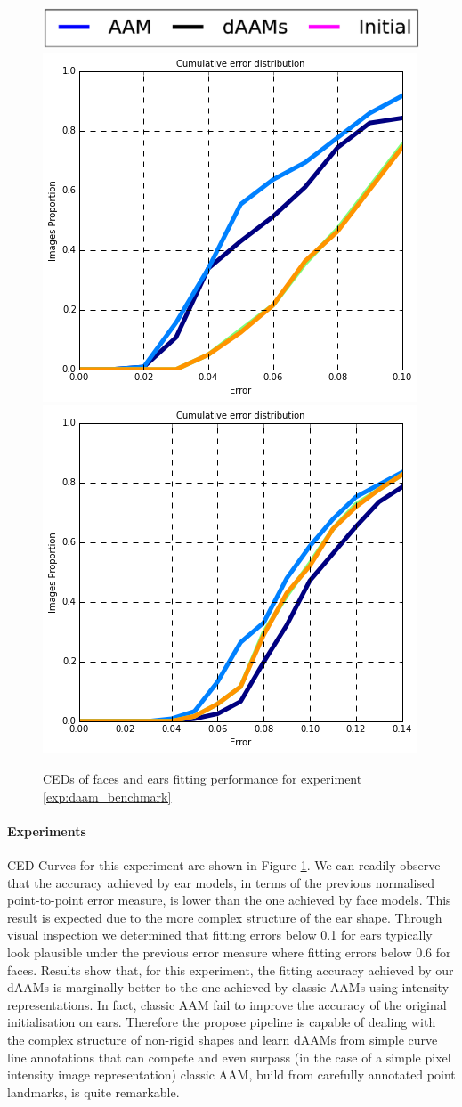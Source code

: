 \begin{figure}[b!]
    \centering
    \includegraphics[width=0.6\columnwidth]{resources/DAAMBenchmark/legend}
    \\
    \includegraphics[width=0.48\columnwidth]{resources/DAAMBenchmark/face}
    \includegraphics[width=0.48\columnwidth]{resources/DAAMBenchmark/ear}
    \caption{CEDs of faces and ears fitting performance for experiment \ref{exp:daam_benchmark}}
    \label{fig:daam_benchmark}
\end{figure}

\paragraph{Experiments} CED Curves for this experiment are shown in Figure \ref{fig:daam_benchmark}. We can readily observe that the accuracy achieved by ear models, in terms of the previous normalised point-to-point error measure, is lower than the one achieved by face models. This result is expected due to the more complex structure of the ear shape. Through visual inspection we determined that fitting errors below 0.1 for ears typically look plausible under the previous error measure where fitting errors below 0.6 for faces. Results show that, for this experiment, the fitting accuracy achieved by our dAAMs is marginally better to the one achieved by classic AAMs using intensity representations. In fact, classic AAM fail to improve the accuracy of the original initialisation on ears. Therefore the propose pipeline is capable of dealing with the complex structure of non-rigid shapes and learn dAAMs from simple curve line annotations that can compete and even surpass (in the case of a simple pixel intensity image representation) classic AAM, build from carefully annotated point landmarks, is quite remarkable.








